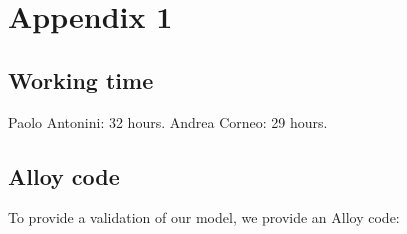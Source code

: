\chapter{Appendix 1}

\section{Working time}

Paolo Antonini: 32 hours.
Andrea Corneo: 29 hours.

\section{Alloy code}

To provide a validation of our model, we provide an Alloy code:


